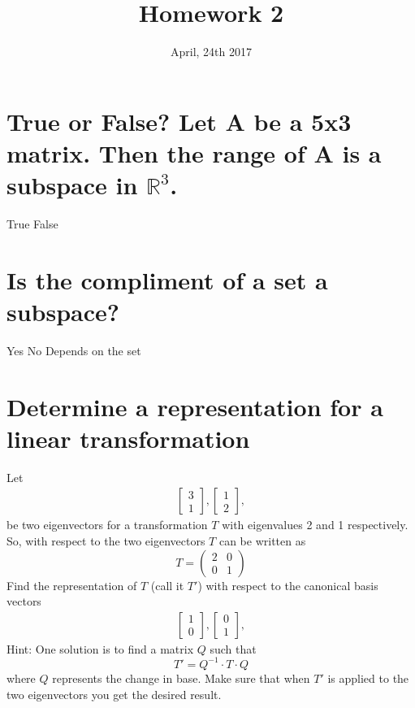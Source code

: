 \documentclass{exam}
\title{Homework 2}
\date{April, 24th 2017}
\begin{document}
\maketitle
\section{True or False? Let A be a 5x3 matrix. Then the range of A is a subspace in $\mathbb{R}^3$.}
\begin{oneparchoices}
 \choice True
 \choice False
\end{oneparchoices}

\section{Is the compliment of a set a subspace?}
\begin{oneparchoices}
 \choice Yes
 \choice No 
 \choice Depends on the set
\end{oneparchoices}

\section{Determine a representation for a linear transformation}
Let 
\begin{eqnarray}
\left[ \begin{array}{c} 3 \\ 1 \end{array} \right],
\left[ \begin{array}{c} 1 \\ 2 \end{array} \right],
\end{eqnarray}
be two eigenvectors for a transformation $T$ with eigenvalues 2 and 1 respectively. So, with respect to the two eigenvectors $T$ can be written as
\[
  T =
\left( {\begin{array}{cccc}
   2 & 0 \\
   0 & 1
  \end{array} } \right)
\]
Find the representation of $T$ (call it $T'$) with respect to the canonical basis vectors
\begin{eqnarray}
\left[ \begin{array}{c} 1 \\ 0 \end{array} \right],
\left[ \begin{array}{c} 0 \\ 1 \end{array} \right],
\end{eqnarray}
Hint: One solution is to find a matrix $Q$ such that $$T' = Q^{-1} \cdot T \cdot Q$$ where $Q$ represents the change in base. Make sure that when $T'$ is applied to the two eigenvectors you get the desired result.
\end{document}

